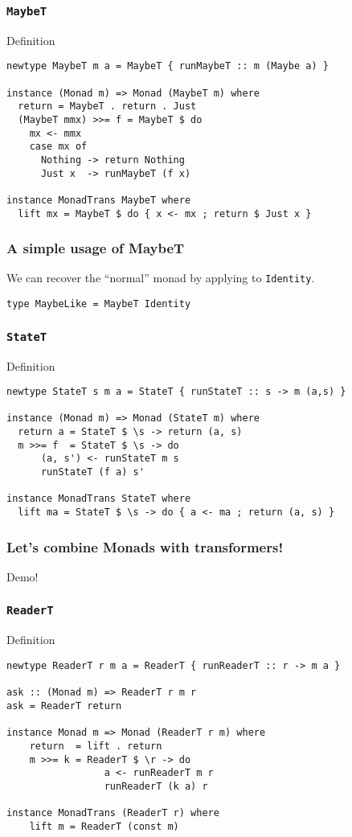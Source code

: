 \documentclass[pdftex,aspectratio=169]{beamer}
\begin{document}
\begin{frame}[fragile]
  \frametitle{\texttt{MaybeT}}
  \begin{block}{Definition}
\begin{lstlisting}
newtype MaybeT m a = MaybeT { runMaybeT :: m (Maybe a) }

instance (Monad m) => Monad (MaybeT m) where
  return = MaybeT . return . Just
  (MaybeT mmx) >>= f = MaybeT $ do
    mx <- mmx
    case mx of
      Nothing -> return Nothing
      Just x  -> runMaybeT (f x)

instance MonadTrans MaybeT where
  lift mx = MaybeT $ do { x <- mx ; return $ Just x }
\end{lstlisting}
  \end{block}
\end{frame}

\begin{frame}[fragile]
  \frametitle{A simple usage of MaybeT}
  We can recover the ``normal'' monad by applying to \lstinline{Identity}.
  \begin{block}{}
  \begin{lstlisting}
type MaybeLike = MaybeT Identity
  \end{lstlisting}
\end{block}
\end{frame}


\begin{frame}[fragile]
  \frametitle{\texttt{StateT}}
  \begin{block}{Definition}
\begin{lstlisting}
newtype StateT s m a = StateT { runStateT :: s -> m (a,s) }

instance (Monad m) => Monad (StateT m) where
  return a = StateT $ \s -> return (a, s)
  m >>= f  = StateT $ \s -> do
      (a, s') <- runStateT m s
      runStateT (f a) s'

instance MonadTrans StateT where
  lift ma = StateT $ \s -> do { a <- ma ; return (a, s) }
\end{lstlisting}
  \end{block}
\end{frame}


\begin{frame}[fragile]
  \frametitle{Let's combine Monads with transformers!}

  Demo!
\end{frame}


\begin{frame}[fragile]
  \frametitle{\texttt{ReaderT}}
  \begin{block}{Definition}
\begin{lstlisting}
newtype ReaderT r m a = ReaderT { runReaderT :: r -> m a }

ask :: (Monad m) => ReaderT r m r
ask = ReaderT return

instance Monad m => Monad (ReaderT r m) where
    return  = lift . return
    m >>= k = ReaderT $ \r -> do
                 a <- runReaderT m r
                 runReaderT (k a) r

instance MonadTrans (ReaderT r) where
    lift m = ReaderT (const m)
\end{lstlisting}
  \end{block}
\end{frame}
\end{document}
